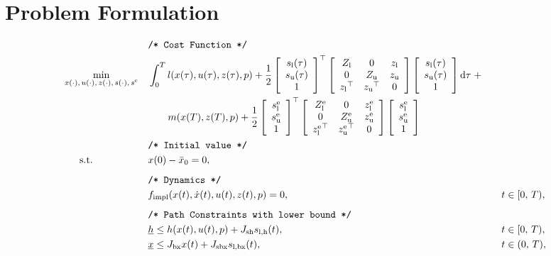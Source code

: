 \documentclass{article}
\newcommand{\tran}{^\top}
\newcommand{\ind}[1]{_{\textrm{#1}}}
\newcommand{\terminal}{^{\textrm{e}}}
\newcommand{\matr}[2]{\left[\begin{array}{#1}#2\end{array}\right]}
\newcommand{\Lower}{\ind{l}}
\newcommand{\lowerh}{\ind{l,h}}
\newcommand{\lowerbx}{\ind{l,bx}}
\newcommand{\upper}{\ind{u}}
\newcommand{\mathComment}[1]{\texttt{/* #1 */}}
\begin{document}
	

	
\section*{Problem Formulation}
	
\begin{align*}
	&&&\mathComment{Cost Function}\\
	&\underset{\begin{subarray}{c}
		x(\cdot),\,u(\cdot), \, z(\cdot), \, s(\cdot), \, s\terminal
		\end{subarray}}{\min}
	&&\int_0^T l(x(\tau), u(\tau), z(\tau), p)
	 + \frac{1}{2} \matr{c}{s\Lower(\tau) \\ s\upper(\tau) \\ 1} \tran
	  \matr{ccc} { Z\Lower & 0 & z\Lower \\
	  0 & Z\upper & z\upper \\
		{z\Lower}\tran & {z\upper}\tran & 0}
	\matr{c}{s\Lower(\tau) \\ s\upper(\tau) \\ 1} \mathrm{d}\tau \; + \\
	 &&& \quad \quad m(x(T), z(T), p) +
	  \frac{1}{2} \matr{c}{s\Lower\terminal \\ s\upper\terminal \\ 1} \tran
	 \matr{ccc} { Z\Lower\terminal & 0 & z\Lower\terminal \\
	 	0 & Z\upper\terminal & z\upper\terminal \\
	 	{z\Lower\terminal}\tran & {z\upper\terminal}\tran & 0}
	 \matr{c}{s\Lower\terminal \\ s\upper\terminal \\ 1}
	 \\
	&&&\mathComment{Initial value}\\
	&\,\,\,\quad \text{s.t.}    &&x(0) - \bar{x}_0 = 0, &&\\
	&&& && \\[-1em]
	&&&\mathComment{Dynamics}\\
	&&& f\ind{impl}(x(t), \dot{x}(t), u(t), z(t), p) = 0, &&\quad t \in [0,\,T),\\
	&&& && \\[-1em]
	&&&\mathComment{Path Constraints with lower bound}\\
	&&&\underline{h} \leq h(x(t), u(t), p) + J_{\textrm{sh}} s\lowerh(t), &&\quad t \in [0,\,T),\\
	&&&\underline{x} \leq J_{\textrm{bx}} x(t) + J_{\textrm{sbx}} s\lowerbx(t), &&\quad t \in (0,\,T),\\

\end{align*}
\end{document}
